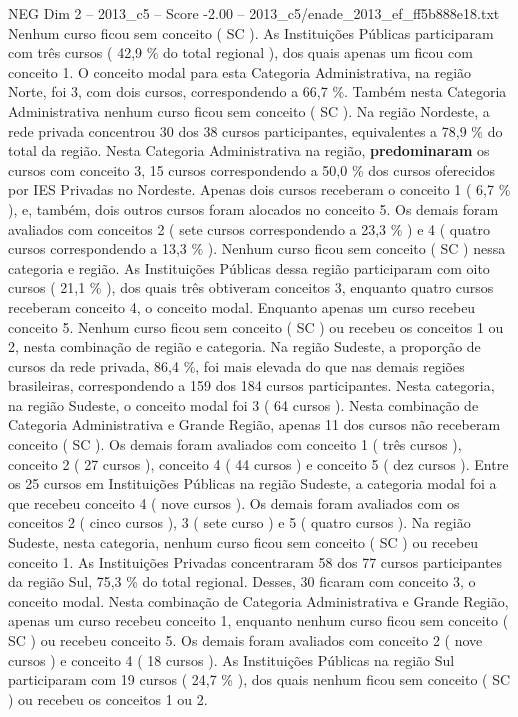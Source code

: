 \begin{textsample}{NEG Dim 2 – 2013\_c5 – Score -2.00 – 2013\_c5/enade\_2013\_ef\_ff5b888e18.txt}
Nenhum curso ficou sem conceito ( SC ).
As Instituições Públicas participaram com três cursos ( 42,9 \% do total regional ), dos quais apenas um ficou com conceito 1.
O conceito modal para esta Categoria Administrativa, na região Norte, foi 3, com dois cursos, correspondendo a 66,7 \%.
Também nesta Categoria Administrativa nenhum curso ficou sem conceito ( SC ).
Na região Nordeste, a rede privada concentrou 30 dos 38 cursos participantes, equivalentes a 78,9 \% do total da região.
Nesta Categoria Administrativa na região, \textbf{predominaram} os cursos com conceito 3, 15 cursos correspondendo a 50,0 \% dos cursos oferecidos por IES Privadas no Nordeste.
Apenas dois cursos receberam o conceito 1 ( 6,7 \% ), e, também, dois outros cursos foram alocados no conceito 5.
Os demais foram avaliados com conceitos 2 ( sete cursos correspondendo a 23,3 \% ) e 4 ( quatro cursos correspondendo a 13,3 \% ).
Nenhum curso ficou sem conceito ( SC ) nessa categoria e região.
As Instituições Públicas dessa região participaram com oito cursos ( 21,1 \% ), dos quais três obtiveram conceitos 3, enquanto quatro cursos receberam conceito 4, o conceito modal.
Enquanto apenas um curso recebeu conceito 5.
Nenhum curso ficou sem conceito ( SC ) ou recebeu os conceitos 1 ou 2, nesta combinação de região e categoria.
Na região Sudeste, a proporção de cursos da rede privada, 86,4 \%, foi mais elevada do que nas demais regiões brasileiras, correspondendo a 159 dos 184 cursos participantes.
Nesta categoria, na região Sudeste, o conceito modal foi 3 ( 64 cursos ).
Nesta combinação de Categoria Administrativa e Grande Região, apenas 11 dos cursos não receberam conceito ( SC ).
Os demais foram avaliados com conceito 1 ( três cursos ), conceito 2 ( 27 cursos ), conceito 4 ( 44 cursos ) e conceito 5 ( dez cursos ).
Entre os 25 cursos em Instituições Públicas na região Sudeste, a categoria modal foi a que recebeu conceito 4 ( nove cursos ).
Os demais foram avaliados com os conceitos 2 ( cinco cursos ), 3 ( sete curso ) e 5 ( quatro cursos ).
Na região Sudeste, nesta categoria, nenhum curso ficou sem conceito ( SC ) ou recebeu conceito 1.
As Instituições Privadas concentraram 58 dos 77 cursos participantes da região Sul, 75,3 \% do total regional.
Desses, 30 ficaram com conceito 3, o conceito modal.
Nesta combinação de Categoria Administrativa e Grande Região, apenas um curso recebeu conceito 1, enquanto nenhum curso ficou sem conceito ( SC ) ou recebeu conceito 5.
Os demais foram avaliados com conceito 2 ( nove cursos ) e conceito 4 ( 18 cursos ).
As Instituições Públicas na região Sul participaram com 19 cursos ( 24,7 \% ), dos quais nenhum ficou sem conceito ( SC ) ou recebeu os conceitos 1 ou 2.

\end{textsample}
